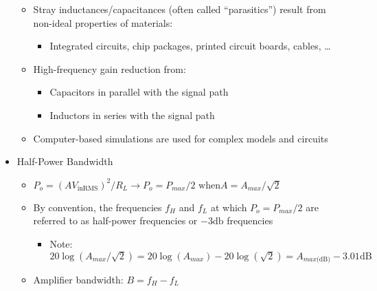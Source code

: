 \begin{itemize}
\begin{itemize}
      \item Stray inductances/capacitances (often called ``parasitics'') result from non-ideal properties of materials:

        \begin{itemize}

          \item Integrated circuits, chip packages, printed circuit boards, cables, \ldots

        \end{itemize}

      \item High-frequency gain reduction from:

        \begin{itemize}

          \item Capacitors in parallel with the signal path

          \item Inductors in series with the signal path

        \end{itemize}

      \item Computer-based simulations are used for complex models and circuits

    \end{itemize}

  \item Half-Power Bandwidth

    \begin{itemize}

      \item $P_o=(AV_{\text{inRMS}})^2/R_L\to P_o=P_{max}/2\text{ when} A=A_{max}/\sqrt{2}$

      \item By convention, the frequencies $f_H$ and $f_L$ at which $P_o=P_{max}/2$ are referred to as half-power frequencies or $-3\text{db}$ frequencies

        \begin{itemize}

          \item Note: $20\log(A_{max}/\sqrt{2})=20\log(A_{max})-20\log(\sqrt{2})=A_{max\text{(dB)}}-3.01\text{dB}$

        \end{itemize}

      \item Amplifier bandwidth: $B=f_H-f_L$


\end{itemize}
\end{itemize}
